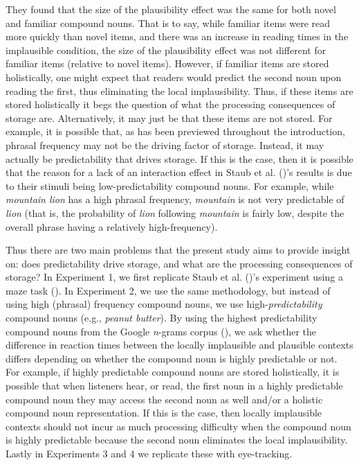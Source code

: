 \documentclass[
  12pt,
  letterpaper,
]{scrreport}
\begin{document}
\noindent They found that the size of the plausibility effect was the
same for both novel and familiar compound nouns. That is to say, while
familiar items were read more quickly than novel items, and there was an
increase in reading times in the implausible condition, the size of the
plausibility effect was not different for familiar items (relative to
novel items). However, if familiar items are stored holistically, one
might expect that readers would predict the second noun upon reading the
first, thus eliminating the local implausibility. Thus, if these items
are stored holistically it begs the question of what the processing
consequences of storage are. Alternatively, it may just be that these
items are not stored. For example, it is possible that, as has been
previewed throughout the introduction, phrasal frequency may not be the
driving factor of storage. Instead, it may actually be predictability
that drives storage. If this is the case, then it is possible that the
reason for a lack of an interaction effect in Staub et al.
()'s results is due
to their stimuli being low-predictability compound nouns. For example,
while \emph{mountain lion} has a high phrasal frequency, \emph{mountain}
is not very predictable of \emph{lion} (that is, the probability of
\emph{lion} following \emph{mountain} is fairly low, despite the overall
phrase having a relatively high-frequency).

Thus there are two main problems that the present study aims to provide
insight on: does predictability drive storage, and what are the
processing consequences of storage? In Experiment 1, we first replicate
Staub et al. ()'s
experiment using a maze task (). In Experiment 2, we use the same methodology, but
instead of using high (phrasal) frequency compound nouns, we use
high-\emph{predictability} compound nouns (e.g., \emph{peanut butter}).
By using the highest predictability compound nouns from the Google
\emph{n}-grams corpus
(), we ask whether the difference in reaction times between the
locally implausible and plausible contexts differs depending on whether
the compound noun is highly predictable or not. For example, if highly
predictable compound nouns are stored holistically, it is possible that
when listeners hear, or read, the first noun in a highly predictable
compound noun they may access the second noun as well and/or a holistic
compound noun representation. If this is the case, then locally
implausible contexts should not incur as much processing difficulty when
the compound noun is highly predictable because the second noun
eliminates the local implausibility. Lastly in Experiments 3 and 4 we
replicate these with eye-tracking.
\end{document}
